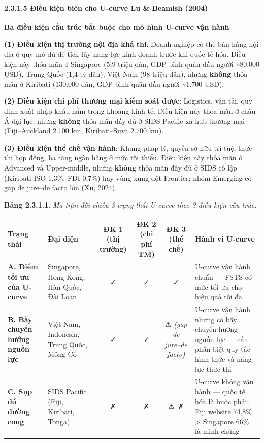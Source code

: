 \documentclass[12pt,a4paper]{article}
\begin{document}
\hypertarget{2315-ux111iux1ec1u-kiux1ec7n-biuxean-cho-u-curve-lu--beamish-2004}{%
\paragraph{2.3.1.5 Điều kiện biên cho U-curve Lu \& Beamish
(2004)}\label{2315-ux111iux1ec1u-kiux1ec7n-biuxean-cho-u-curve-lu--beamish-2004}}

\textbf{Ba điều kiện cấu trúc bắt buộc cho mô hình U-curve vận hành}:

\textbf{(1) Điều kiện thị trường nội địa khả thi}: Doanh nghiệp có thể
bán hàng nội địa ở quy mô đủ để tích lũy năng lực kinh doanh trước khi
quốc tế hóa. Điều kiện này thỏa mãn ở Singapore (5,9 triệu dân, GDP bình
quân đầu người \textasciitilde80.000 USD), Trung Quốc (1,4 tỷ dân), Việt
Nam (98 triệu dân), nhưng \textbf{không} thỏa mãn ở Kiribati (130.000
dân, GDP bình quân đầu người \textasciitilde1.700 USD).

\textbf{(2) Điều kiện chi phí thương mại kiểm soát được}: Logistics, vận
tải, quy định xuất nhập khẩu nằm trong khoảng kinh tế. Điều kiện này
thỏa mãn ở châu Á đại lục, nhưng \textbf{không} thỏa mãn đầy đủ ở SIDS
Pacific xa hub thương mại (Fiji--Auckland 2.100 km, Kiribati--Suva 2.700
km).

\textbf{(3) Điều kiện thể chế vận hành}: Khung pháp lý, quyền sở hữu trí
tuệ, thực thi hợp đồng, hạ tầng ngân hàng ở mức tối thiểu. Điều kiện này
thỏa mãn ở Advanced và Upper-middle, nhưng \textbf{không} thỏa mãn đầy
đủ ở SIDS cô lập (Kiribati ISO 1,3\%, FDI 0,7\%) hay vùng xung đột
Frontier; nhóm Emerging có gap de jure--de facto lớn (Xu, 2024).

\textbf{Bảng 2.3.1.1}. \emph{Ma trận đối chiếu 3 trạng thái U-curve theo
3 điều kiện cấu trúc.}

\begin{longtable}[]{@{}llcccl@{}}
\toprule\noalign{}
Trạng thái & Đại diện & ĐK 1 (thị trường) & ĐK 2 (chi phí TM) & ĐK 3
(thể chế) & Hành vi U-curve \\
\midrule\noalign{}
\endhead
\bottomrule\noalign{}
\endlastfoot
\textbf{A. Điểm tối ưu của U-curve} & Singapore, Hong Kong, Hàn Quốc,
Đài Loan & ✓ & ✓ & ✓ & U-curve vận hành chuẩn --- FSTS có mức tối ưu cho
hiệu quả tối đa \\
\textbf{B. Bẫy chuyển hướng nguồn lực} & Việt Nam, Indonesia, Trung
Quốc, Mông Cổ & ✓ & ✓ & ⚠ \emph{(gap de jure--de facto)} & U-curve vận
hành nhưng có bẫy chuyển hướng nguồn lực --- cần phân biệt quy tắc hình
thức và năng lực thực thi \\
\textbf{C. Sụp đổ đường cong} & SIDS Pacific (Fiji, Kiribati, Tonga) & ✗
& ✗ & ⚠--✗ & U-curve không vận hành --- quốc tế hóa là buộc phải; Fiji
website 74,8\% \textgreater{} Singapore 66\% là minh chứng \\
\end{longtable}
\end{document}
